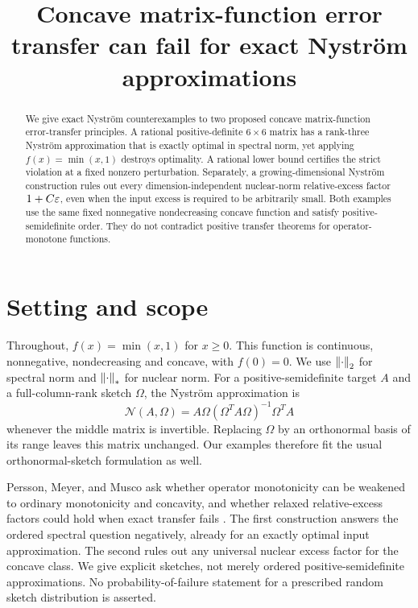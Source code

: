 \documentclass[11pt]{article}
\title{Concave matrix-function error transfer can fail for exact Nystr\"om approximations}
\author{}
\date{}
\begin{document}
\maketitle
\begin{abstract}
We give exact Nystr\"om counterexamples to two proposed concave matrix-function error-transfer principles. A rational positive-definite $6\times6$ matrix has a rank-three Nystr\"om approximation that is exactly optimal in spectral norm, yet applying $f(x)=\min(x,1)$ destroys optimality. A rational lower bound certifies the strict violation at a fixed nonzero perturbation. Separately, a growing-dimensional Nystr\"om construction rules out every dimension-independent nuclear-norm relative-excess factor $1+C\varepsilon$, even when the input excess is required to be arbitrarily small. Both examples use the same fixed nonnegative nondecreasing concave function and satisfy positive-semidefinite order. They do not contradict positive transfer theorems for operator-monotone functions.
\end{abstract}

\section{Setting and scope}
Throughout, $f(x)=\min(x,1)$ for $x\ge0$. This function is continuous, nonnegative, nondecreasing and concave, with $f(0)=0$. We use $\left\lVert\cdot\right\rVert_2$ for spectral norm and $\left\lVert\cdot\right\rVert_*$ for nuclear norm. For a positive-semidefinite target $A$ and a full-column-rank sketch $\Omega$, the Nystr\"om approximation is
\[
 \mathcal N(A,\Omega)=A\Omega(\Omega^TA\Omega)^{-1}\Omega^TA
\]
whenever the middle matrix is invertible. Replacing $\Omega$ by an orthonormal basis of its range leaves this matrix unchanged. Our examples therefore fit the usual orthonormal-sketch formulation as well.

Persson, Meyer, and Musco ask whether operator monotonicity can be weakened to ordinary monotonicity and concavity, and whether relaxed relative-excess factors could hold when exact transfer fails \cite[Table~1 and Section~5]{PMM2025}. The first construction answers the ordered spectral question negatively, already for an exactly optimal input approximation. The second rules out any universal nuclear excess factor for the concave class. We give explicit sketches, not merely ordered positive-semidefinite approximations. No probability-of-failure statement for a prescribed random sketch distribution is asserted.
\end{document}
